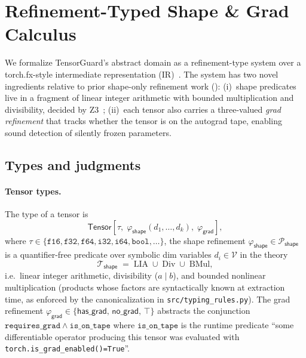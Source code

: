 \section{Refinement-Typed Shape \& Grad Calculus}
\label{sec:refinement-types}

We formalize TensorGuard's abstract domain as a refinement-type
system over a torch.fx-style intermediate representation
(IR)~\cite{reed2022torchfx}. The system has two novel ingredients
relative to prior shape-only refinement work
(): (i)~shape predicates live in a fragment of
linear integer arithmetic with bounded multiplication and
divisibility, decided by Z3~\cite{moura2008z3}; (ii)~each tensor
also carries a three-valued \emph{grad refinement} that tracks
whether the tensor is on the autograd tape, enabling sound
detection of silently frozen parameters.

\subsection{Types and judgments}
\label{sec:rt:types}

\paragraph{Tensor types.} The type of a tensor is
\[
  \mathsf{Tensor}[\tau,\;\varphi_{\mathsf{shape}}(d_1,\dots,d_k),\;\varphi_{\mathsf{grad}}],
\]
where $\tau\in\{\mathtt{f16},\mathtt{f32},\mathtt{f64},\mathtt{i32},\mathtt{i64},\mathtt{bool},\dots\}$,
the shape refinement
$\varphi_{\mathsf{shape}}\in\mathcal{P}_{\mathsf{shape}}$ is a
quantifier-free predicate over symbolic dim variables
$d_i\in\mathcal{V}$ in the theory
\[
  \mathcal{T}_{\mathsf{shape}} \;=\; \mathrm{LIA} \;\cup\;
  \mathrm{Div} \;\cup\; \mathrm{BMul},
\]
i.e.\ linear integer arithmetic, divisibility ($a\mid b$), and
bounded nonlinear multiplication (products whose factors are
syntactically known at extraction time, as enforced by the
canonicalization in
\texttt{src/typing\_rules.py}). The grad refinement
\(
  \varphi_{\mathsf{grad}}\in\{\mathsf{has\_grad},\,\mathsf{no\_grad},\,\top\}
\)
abstracts the conjunction
$\mathtt{requires\_grad}\wedge\mathtt{is\_on\_tape}$ where
$\mathtt{is\_on\_tape}$ is the runtime predicate ``some
differentiable operator producing this tensor was evaluated with
\texttt{torch.is\_grad\_enabled()=True}''.


